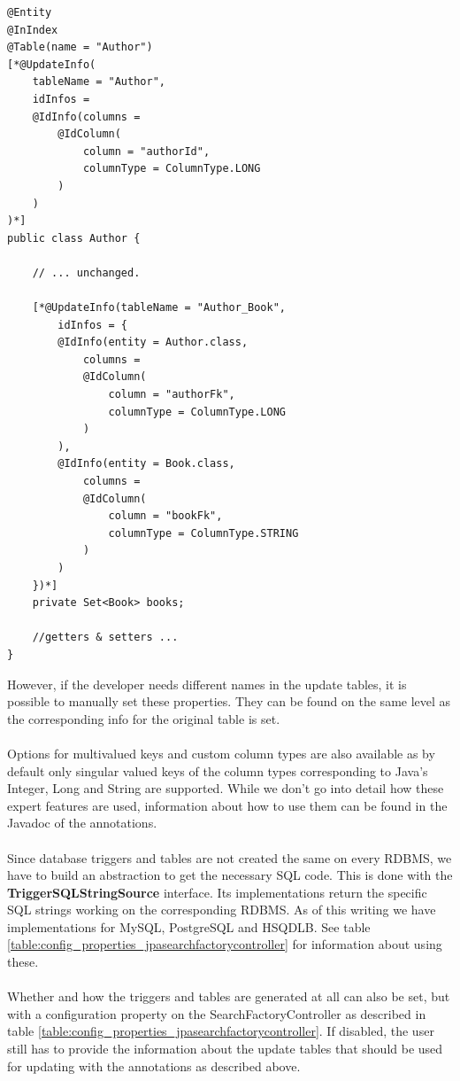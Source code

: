 \lstset{language=java}
\begin{lstlisting}[frame=htrbl, caption={Author.java with Hibernate Search annotations}, label={lst:author.java_3}]
@Entity
@InIndex
@Table(name = "Author")
[*@UpdateInfo(
	tableName = "Author", 
	idInfos = 
	@IdInfo(columns = 
		@IdColumn(
			column = "authorId", 
			columnType = ColumnType.LONG
		)
	)
)*]
public class Author {
	
	// ... unchanged.
	
	[*@UpdateInfo(tableName = "Author_Book", 
		idInfos = {
		@IdInfo(entity = Author.class, 
			columns = 
			@IdColumn(
				column = "authorFk",
				columnType = ColumnType.LONG
			)
		),
		@IdInfo(entity = Book.class,
			columns = 
			@IdColumn(
				column = "bookFk",
				columnType = ColumnType.STRING
			)
		)
	})*]
	private Set<Book> books;
	
	//getters & setters ...
}
\end{lstlisting}
\noindent
However, if the developer needs different names in the update tables, it is possible to manually set these properties. They can be found on the same level as the corresponding info for the original table is set.
\\\\
Options for multivalued keys and custom column types are also available as by default only singular valued keys of the column types corresponding to Java's Integer, Long and String are supported. While we don't go into detail how these expert features are used, information about how to use them can be found in the Javadoc of the annotations.
\\\\
Since database triggers and tables are not created the same on every RDBMS, we have to build an abstraction to get the necessary SQL code. This is done with the \textbf{TriggerSQLStringSource} interface. Its implementations return the specific SQL strings working on the corresponding RDBMS. As of this writing we have implementations for MySQL, PostgreSQL and HSQDLB. See table \ref{table:config_properties_jpasearchfactorycontroller} for information about using these.
\\\\
Whether and how the triggers and tables are generated at all can also be set, but with a configuration property on the SearchFactoryController as described in table  \ref{table:config_properties_jpasearchfactorycontroller}. If disabled, the user still has to provide the information about the update tables that should be used for updating with the annotations as described above.

